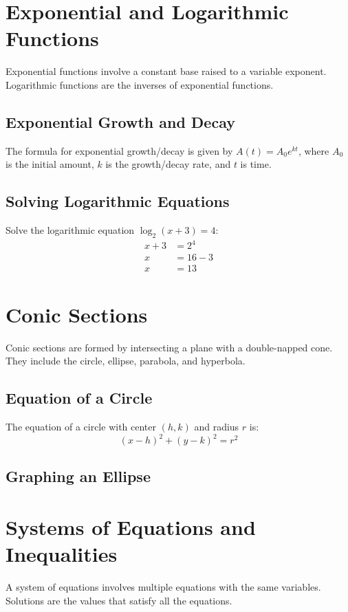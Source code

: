 \documentclass{article}
\begin{document}
\section{Exponential and Logarithmic Functions}
Exponential functions involve a constant base raised to a variable exponent. Logarithmic functions are the inverses of exponential functions.

\subsection{Exponential Growth and Decay}
The formula for exponential growth/decay is given by $A(t) = A_0 e^{kt}$, where $A_0$ is the initial amount, $k$ is the growth/decay rate, and $t$ is time.

\subsection{Solving Logarithmic Equations}
Solve the logarithmic equation $\log_2(x + 3) = 4$:
\begin{align*}
    x + 3 &= 2^4 \\
    x &= 16 - 3 \\
    x &= 13
\end{align*}

\section{Conic Sections}
Conic sections are formed by intersecting a plane with a double-napped cone. They include the circle, ellipse, parabola, and hyperbola.

\subsection{Equation of a Circle}
The equation of a circle with center $(h, k)$ and radius $r$ is:
\[ (x - h)^2 + (y - k)^2 = r^2 \]

\subsection{Graphing an Ellipse}

\section{Systems of Equations and Inequalities}
A system of equations involves multiple equations with the same variables. Solutions are the values that satisfy all the equations.
\end{document}
